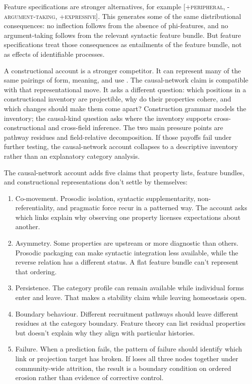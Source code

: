 \documentclass[12pt]{article}
\begin{document}
Feature specifications are stronger alternatives, for example
[\textsc{+peripheral}, \textsc{-argument-taking},
\textsc{+expressive}]. This generates some of the same distributional
consequences: no inflection follows from the absence of phi-features,
and no argument-taking follows from the relevant syntactic feature
bundle. But feature specifications treat those consequences as
entailments of the feature bundle, not as effects of identifiable
processes.

A constructional account is a stronger competitor. It can represent
many of the same pairings of form, meaning, and use
\citep{goldberg1995constructions,goldberg2006,croft2001}. The
causal-network claim is compatible with that representational move. It
asks a different question: which positions in a constructional inventory
are projectible, why do their properties cohere, and which changes
should make them come apart? Construction grammar models the inventory;
the causal-kind question asks where the inventory supports
cross-constructional and cross-field inference. The two main pressure
points are pathway residues and field-relative decomposition. If those
payoffs fail under further testing, the causal-network account collapses
to a descriptive inventory rather than an explanatory category analysis.

The causal-network account adds five claims that property lists, feature
bundles, and constructional representations don't settle by themselves:

\begin{enumerate}
\item Co-movement. Prosodic isolation, syntactic supplementarity,
  non-referentiality, and pragmatic force recur in a patterned way. The
  account asks which links explain why observing one property licenses
  expectations about another.
\item Asymmetry. Some properties are upstream or more diagnostic than
  others. Prosodic packaging can make syntactic integration less
  available, while the reverse relation has a different status. A flat
  feature bundle can't represent that ordering.
\item Persistence. The category profile can remain available while
  individual forms enter and leave. That makes a stability claim while
  leaving homeostasis open.
\item Boundary behaviour. Different recruitment pathways should leave
  different residues at the category boundary. Feature theory can list
  residual properties but doesn't explain why they align with
  particular histories.
\item Failure. When a prediction fails, the pattern of failure should
  identify which link or projection target has broken. If 
  loses all three nodes together under community-wide attrition, the
  result is a boundary condition on ordered erosion rather than evidence of corrective
  control.
\end{enumerate}
\end{document}
